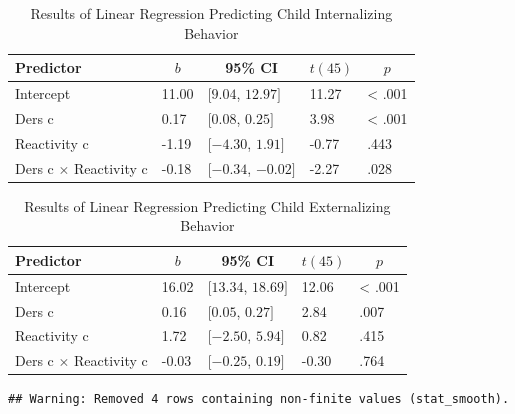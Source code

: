 \documentclass[man]{apa6}
\begin{document}
\begin{table}[tbp]
\begin{center}
\begin{threeparttable}
\caption{\label{tab:linear regression internalizing}Results of Linear Regression Predicting Child Internalizing Behavior}
\begin{tabular}{lllll}
\toprule
Predictor & \multicolumn{1}{c}{$b$} & \multicolumn{1}{c}{95\% CI} & \multicolumn{1}{c}{$t(45)$} & \multicolumn{1}{c}{$p$}\\
\midrule
Intercept & 11.00 & $[9.04$, $12.97]$ & 11.27 & < .001\\
Ders c & 0.17 & $[0.08$, $0.25]$ & 3.98 & < .001\\
Reactivity c & -1.19 & $[-4.30$, $1.91]$ & -0.77 & .443\\
Ders c $\times$ Reactivity c & -0.18 & $[-0.34$, $-0.02]$ & -2.27 & .028\\
\bottomrule
\end{tabular}
\end{threeparttable}
\end{center}
\end{table}

\begin{table}[tbp]
\begin{center}
\begin{threeparttable}
\caption{\label{tab:linear regression externalizing}Results of Linear Regression Predicting Child Externalizing Behavior}
\begin{tabular}{lllll}
\toprule
Predictor & \multicolumn{1}{c}{$b$} & \multicolumn{1}{c}{95\% CI} & \multicolumn{1}{c}{$t(45)$} & \multicolumn{1}{c}{$p$}\\
\midrule
Intercept & 16.02 & $[13.34$, $18.69]$ & 12.06 & < .001\\
Ders c & 0.16 & $[0.05$, $0.27]$ & 2.84 & .007\\
Reactivity c & 1.72 & $[-2.50$, $5.94]$ & 0.82 & .415\\
Ders c $\times$ Reactivity c & -0.03 & $[-0.25$, $0.19]$ & -0.30 & .764\\
\bottomrule
\end{tabular}
\end{threeparttable}
\end{center}
\end{table}

\begin{verbatim}
## Warning: Removed 4 rows containing non-finite values (stat_smooth).
\end{verbatim}
\end{document}
